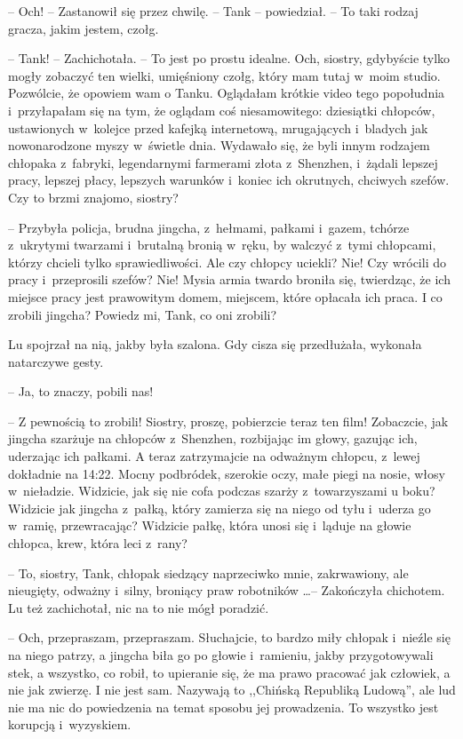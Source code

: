 \documentclass[oneside,polish,11pt,rmheadings]{mwbk}
\begin{document}
-- Och! -- Zastanowił się przez chwilę. -- Tank -- powiedział. -- To taki rodzaj gracza, jakim jestem, czołg.

-- Tank! -- Zachichotała. -- To jest po prostu idealne. Och, siostry, gdybyście tylko mogły zobaczyć ten wielki, umięśniony czołg, który mam tutaj w~moim studio. Pozwólcie, że opowiem wam o Tanku. Oglądałam krótkie video tego popołudnia i~przyłapałam się na tym, że oglądam coś niesamowitego: dziesiątki chłopców, ustawionych w~kolejce przed kafejką internetową, mrugających i~bladych jak nowonarodzone myszy w~świetle dnia. Wydawało się, że byli innym rodzajem chłopaka z~fabryki, legendarnymi farmerami złota z~Shenzhen, i~żądali lepszej pracy, lepszej płacy, lepszych warunków i~koniec ich okrutnych, chciwych szefów. Czy to brzmi znajomo, siostry?

-- Przybyła policja, brudna jingcha, z~hełmami, pałkami i~gazem, tchórze z~ukrytymi twarzami i~brutalną bronią w~ręku, by walczyć z~tymi chłopcami, którzy chcieli tylko sprawiedliwości. Ale czy chłopcy uciekli? Nie! Czy wrócili do pracy i~przeprosili szefów? Nie! Mysia armia twardo broniła się, twierdząc, że ich miejsce pracy jest prawowitym domem, miejscem, które opłacała ich praca. I co zrobili jingcha? Powiedz mi, Tank, co oni zrobili?

Lu spojrzał na nią, jakby była szalona. Gdy cisza się przedłużała, wykonała natarczywe gesty. 

-- Ja, to znaczy, pobili nas! 

-- Z pewnością to zrobili! Siostry, proszę, pobierzcie teraz ten film! Zobaczcie, jak jingcha szarżuje na chłopców z~Shenzhen, rozbijając im głowy, gazując ich, uderzając ich pałkami. A teraz zatrzymajcie na odważnym chłopcu, z~lewej dokładnie na 14:22. Mocny podbródek, szerokie oczy, małe piegi na nosie, włosy w~nieładzie. Widzicie, jak się nie cofa podczas szarży z~towarzyszami u boku? Widzicie jak jingcha z~pałką, który zamierza się na niego od tyłu i~uderza go w~ramię, przewracając? Widzicie pałkę, która unosi się i~ląduje na głowie chłopca, krew, która leci z~rany?

-- To, siostry, Tank, chłopak siedzący naprzeciwko mnie, zakrwawiony, ale nieugięty, odważny i~silny, broniący praw robotników \ldots  -- Zakończyła chichotem. Lu też zachichotał, nic na to nie mógł poradzić. 

-- Och, przepraszam, przepraszam. Słuchajcie, to bardzo miły chłopak i~nieźle się na niego patrzy, a jingcha biła go po głowie i~ramieniu, jakby przygotowywali stek, a wszystko, co robił, to upieranie się, że ma prawo pracować jak człowiek, a nie jak zwierzę. I nie jest sam. Nazywają to ,,Chińską Republiką Ludową'', ale lud nie ma nic do powiedzenia na temat sposobu jej prowadzenia. To wszystko jest korupcją i~wyzyskiem.
\end{document}
